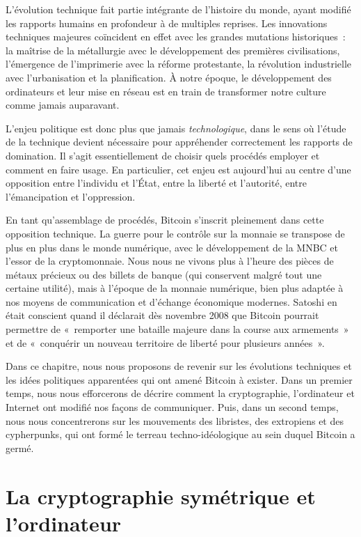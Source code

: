 \documentclass[
  a5paper,
  smalldemyvopaper,10pt,twoside,onecolumn,openright,extrafontsizes,hidelinks]{memoir}
\begin{document}
L'évolution technique fait partie intégrante de l'histoire du monde,
ayant modifié les rapports humains en profondeur à de multiples
reprises. Les innovations techniques majeures coïncident en effet avec
les grandes mutations historiques~: la maîtrise de la métallurgie avec
le développement des premières civilisations, l'émergence de
l'imprimerie avec la réforme protestante, la révolution industrielle
avec l'urbanisation et la planification. À notre époque, le
développement des ordinateurs et leur mise en réseau est en train de
transformer notre culture comme jamais auparavant.

L'enjeu politique est donc plus que jamais \emph{technologique}, dans le
sens où l'étude de la technique devient nécessaire pour appréhender
correctement les rapports de domination. Il s'agit essentiellement de
choisir quels procédés employer et comment en faire usage. En
particulier, cet enjeu est aujourd'hui au centre d'une opposition entre
l'individu et l'État, entre la liberté et l'autorité, entre
l'émancipation et l'oppression.

En tant qu'assemblage de procédés, Bitcoin s'inscrit pleinement dans
cette opposition technique. La guerre pour le contrôle sur la monnaie se
transpose de plus en plus dans le monde numérique, avec le développement
de la MNBC et l'essor de la cryptomonnaie. Nous nous ne vivons plus à
l'heure des pièces de métaux précieux ou des billets de banque (qui
conservent malgré tout une certaine utilité), mais à l'époque de la
monnaie numérique, bien plus adaptée à nos moyens de communication et
d'échange économique modernes. Satoshi en était conscient quand il
déclarait dès novembre 2008 que Bitcoin pourrait permettre de
«~remporter une bataille majeure dans la course aux armements~» et de
«~conquérir un nouveau territoire de liberté pour plusieurs années~».

Dans ce chapitre, nous nous proposons de revenir sur les évolutions
techniques et les idées politiques apparentées qui ont amené Bitcoin à
exister. Dans un premier temps, nous nous efforcerons de décrire comment
la cryptographie, l'ordinateur et Internet ont modifié nos façons de
communiquer. Puis, dans un second temps, nous nous concentrerons sur les
mouvements des libristes, des extropiens et des cypherpunks, qui ont
formé le terreau techno-idéologique au sein duquel Bitcoin a germé.

\section*{La cryptographie symétrique et
l'ordinateur}\label{la-cryptographie-symuxe9trique-et-lordinateur}
\end{document}
